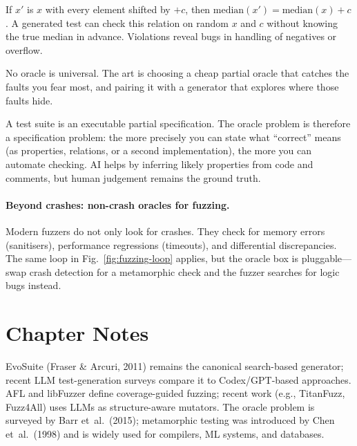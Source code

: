 \begin{example}
If $x'$ is $x$ with every element shifted by $+c$, then $\text{median}(x') = \text{median}(x)+c$. A generated test can check this relation on random $x$ and $c$ without knowing the true median in advance. Violations reveal bugs in handling of negatives or overflow.
\end{example}

No oracle is universal. The art is choosing a cheap partial oracle that catches the faults you fear most, and pairing it with a generator that explores where those faults hide.

\begin{remark}
A test suite is an executable partial specification. The oracle problem is therefore a specification problem: the more precisely you can state what ``correct'' means (as properties, relations, or a second implementation), the more you can automate checking. AI helps by inferring likely properties from code and comments, but human judgement remains the ground truth.
\end{remark}

\paragraph{Beyond crashes: non-crash oracles for fuzzing.} Modern fuzzers do not only look for crashes. They check for memory errors (sanitisers), performance regressions (timeouts), and differential discrepancies. The same loop in Fig.~\ref{fig:fuzzing-loop} applies, but the oracle box is pluggable---swap crash detection for a metamorphic check and the fuzzer searches for logic bugs instead.

\section{Chapter Notes}
EvoSuite (Fraser \& Arcuri, 2011) remains the canonical search-based generator; recent LLM test-generation surveys compare it to Codex/GPT-based approaches. AFL and libFuzzer define coverage-guided fuzzing; recent work (e.g., TitanFuzz, Fuzz4All) uses LLMs as structure-aware mutators. The oracle problem is surveyed by Barr et~al.\ (2015); metamorphic testing was introduced by Chen et~al.\ (1998) and is widely used for compilers, ML systems, and databases.

